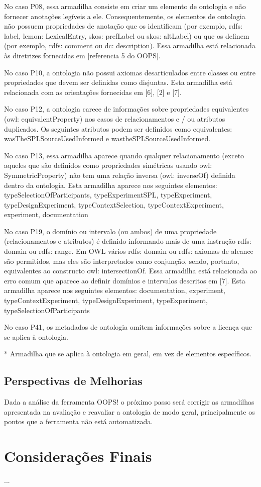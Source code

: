 No caso P08, essa armadilha consiste em criar um elemento de ontologia e não fornecer anotações legíveis a ele. Consequentemente, os elementos de ontologia não possuem propriedades de anotação que os identificam (por exemplo, rdfs: label, lemon: LexicalEntry, skos: prefLabel ou skos: altLabel) ou que os definem (por exemplo, rdfs: comment ou dc: description). Essa armadilha está relacionada às diretrizes fornecidas em [referencia 5 do OOPS].

No caso P10, a ontologia não possui axiomas desarticulados entre classes ou entre propriedades que devem ser definidas como disjuntas. Esta armadilha está relacionada com as orientações fornecidas em [6], [2] e [7].

No caso P12, a ontologia carece de informações sobre propriedades equivalentes (owl: equivalentProperty) nos casos de relacionamentos e / ou atributos duplicados. Os seguintes atributos podem ser definidos como equivalentes: wasTheSPLSourceUsedInformed e wastheSPLSourceUsedInformed.

No caso P13, essa armadilha aparece quando qualquer relacionamento (exceto aqueles que são definidos como propriedades simétricas usando owl: SymmetricProperty) não tem uma relação inversa (owl: inverseOf) definida dentro da ontologia. Esta armadilha aparece nos seguintes elementos: typeSelectionOfParticipants, typeExperimentSPL, typeExperiment, typeDesignExperiment, typeContextSelection, typeContextExperiment, experiment, documentation 

No caso P19, o domínio ou intervalo (ou ambos) de uma propriedade (relacionamentos e atributos) é definido informando mais de uma instrução rdfs: domain ou rdfs: range. Em OWL vários rdfs: domain ou rdfs: axiomas de alcance são permitidos, mas eles são interpretados como conjunção, sendo, portanto, equivalentes ao constructo owl: intersectionOf. Essa armadilha está relacionada ao erro comum que aparece ao definir domínios e intervalos descritos em [7]. Esta armadilha aparece nos seguintes elementos: documentation, experiment, typeContextExperiment, typeDesignExperiment, typeExperiment, typeSelectionOfParticipants 

No caso P41, os metadados de ontologia omitem informações sobre a licença que se aplica à ontologia.

* Armadilha que se aplica à ontologia em geral, em vez de elementos específicos.

\subsection{Perspectivas de Melhorias}
Dada a análise da ferramenta OOPS! o próximo passo será corrigir as armadilhas apresentada na avaliação e reavaliar a ontologia de modo geral, principalmente os pontos que a ferramenta não está automatizada.


\section{Considerações Finais}
\label{sec:concidaracoes_finais}

...